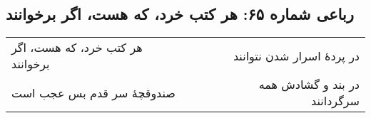 \begin{center}
\section*{رباعی شماره ۶۵: هر کتب خرد، که هست، اگر برخوانند}
\label{sec:065}
\begin{longtable}{l p{0.5cm} r}
هر کتب خرد، که هست، اگر برخوانند
&&
در پردهٔ اسرار شدن نتوانند
\\
صندوقچهٔ سر قدم بس عجب است
&&
در بند و گشادش همه سرگردانند
\\
\end{longtable}
\end{center}
